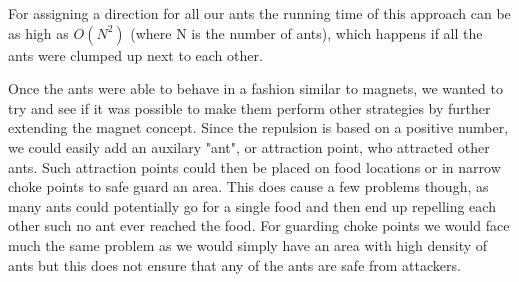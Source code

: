 For assigning a direction for all our ants the running time of this approach can be as high as $O(N^2)$ (where N is the number of ants), which happens if all the ants were clumped up next to each other.

Once the ants were able to behave in a fashion similar to magnets, we wanted to try and see if it was possible to make them perform other strategies by further extending the magnet concept. Since the repulsion is based on a positive number, we could easily add an auxilary "ant", or attraction point, who attracted other ants. Such attraction points could then be placed on food locations or in narrow choke points to safe guard an area. This does cause a few problems though, as many ants could potentially go for a single food and then end up repelling each other such no ant ever reached the food. For guarding choke points we would face much the same problem as we would simply have an area with high density of ants but this does not ensure that any of the ants are safe from attackers.